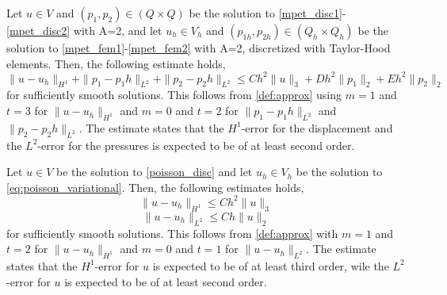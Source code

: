 \begin{definition}[\textbf{A priori estimate (MPET, A=2)}]
Let $u\in V$ and $(p_1, p_2) \in( Q \times Q)$ be the solution to \eqref{mpet_disc1}-\eqref{mpet_disc2} with A=2, and let $u_h \in V_h$ and $(p_{1h}, p_{2h}) \in (Q_h \times Q_h)$ be the solution to \eqref{mpet_fem1}-\eqref{mpet_fem2} with A=2, discretized with Taylor-Hood elements. Then, the following estimate holds,
\begin{equation*}
\|u - u_h \|_{H^1} + \|p_1 - p_1h \|_{L^2} + \|p_2 - p_2h \|_{L^2} \leq Ch^2\|u \|_3 + Dh^2\|p_1 \|_2 + E h^2\|p_2 \|_2
\end{equation*}
for sufficiently smooth solutions. This follows from \eqref{def:approx} using $m=1$ and $t=3$ for $\|u - u_h \|_{H^1}$ and $m=0$ and $t=2$ for $\|p_1 - p_1h \|_{L^2}$ and $\|p_2 - p_2h \|_{L^2}$. The estimate states that the $H^1$-error for the displacement and the $L^2$-error for the pressures is expected to be of at least second order. 
\end{definition}

\begin{definition}
Let $u\in V$ be the solution to \eqref{poisson_disc} and let $u_h \in V_h$ be the solution to \eqref{eq:poisson_variational}. Then, the following estimates holds,
\begin{equation*}
\|u - u_h\|_{H^1} \leq Ch^2\|u \|_3
\end{equation*} 
\begin{equation*}
\|u - u_h\|_{L^2} \leq Ch\|u \|_2
\end{equation*}
for sufficiently smooth solutions. This follows from \eqref{def:approx} with $m=1$ and $t=2$ for $\|u - u_h\|_{H^1}$ and $m=0$ and $t=1$ for $\|u - u_h\|_{L^2}$. The estimate states that the $H^1$-error for $u$ is expected to be of at least third order, wile the $L^2$-error for $u$ is expected to be of at least second order.
\end{definition}

